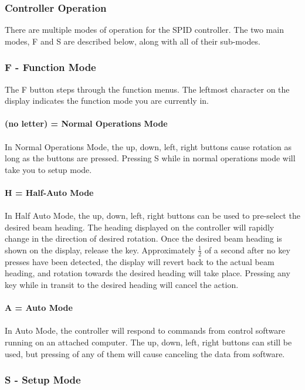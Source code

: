 \documentclass[11pt]{article} %
\begin{document}
\subsubsection{Controller Operation}

There are multiple modes of operation for the SPID controller. The two main modes, F and S are described below, along with all of their sub-modes.

\subsubsection{F - Function Mode}

The F button steps through the function menus. The leftmost character on the display indicates the function mode you are currently in.
\\ \\
\textbf{(no letter) = Normal Operations Mode}
\\ \\
In Normal Operations Mode, the up, down, left, right buttons cause rotation as long as the buttons are pressed. Pressing S while in normal operations mode will take you to setup mode.
\\ \\
\textbf{H = Half-Auto Mode}
\\ \\
In Half Auto Mode, the up, down, left, right buttons can be used to pre-select the desired beam heading. The heading displayed on the controller will rapidly change in the direction of desired rotation. Once the desired beam heading is shown on the display, release the key. Approximately $\frac{1}{2}$ of a second after no key presses have been detected, the display will revert back to the actual beam heading, and rotation towards the desired heading will take place. Pressing any key while in transit to the desired heading will cancel the action.
\\ \\
\textbf{A = Auto Mode}
\\ \\
In Auto Mode, the controller will respond to commands from control software running on an attached computer. The up, down, left, right buttons can still be used, but pressing of any of them will cause canceling the data from software.

\subsubsection{S - Setup Mode}
\end{document}
